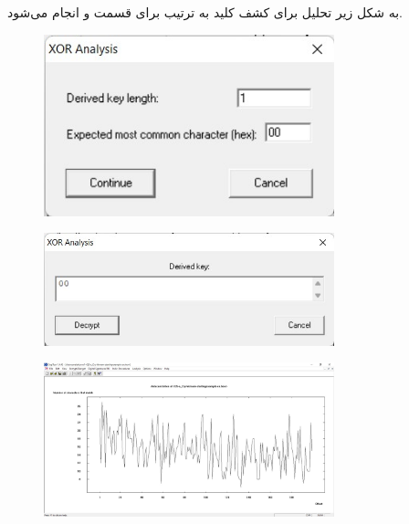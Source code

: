 \documentclass{article}
\begin{document}
\subsection{}
به شکل زیر تحلیل برای کشف کلید  به ترتیب برای قسمت  و  انجام می‌شود.
\begin{figure}[H]
    \centering
    \includegraphics[width=0.75\textwidth]{figures/5ca.jpg}
    \caption
	{}
    \label{fig:fig1}
\end{figure}
\begin{figure}[H]
    \centering
    \includegraphics[width=0.75\textwidth]{figures/5cb.jpg}
    \caption
	{}
    \label{fig:fig1}
\end{figure}
\begin{figure}[H]
    \centering
    \includegraphics[width=0.75\textwidth]{figures/5cc.jpg}
    \caption
	{}
    \label{fig:fig1}
\end{figure}
\end{document}
